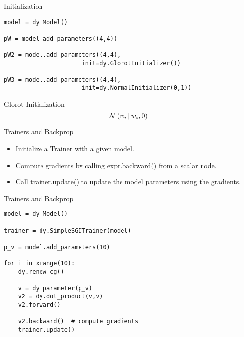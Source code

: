 \documentclass[compress]{beamer}
\begin{document}
\begin{frame}[fragile]{Initialization}

\begin{verbatim}
model = dy.Model()

pW = model.add_parameters((4,4))

pW2 = model.add_parameters((4,4),
                      init=dy.GlorotInitializer())

pW3 = model.add_parameters((4,4),
                      init=dy.NormalInitializer(0,1))
\end{verbatim}

\begin{block}{Glorot Initialization}
  \begin{equation}
    \Norm{w_i}{0}{\frac{1}{n_{\textit{in}, \textit{out}}}}
  \end{equation}
\end{block}

\end{frame}


\begin{frame}{Trainers and Backprop}

\begin{itemize}

\item Initialize a Trainer with a given model.
\item Compute gradients by calling expr.backward() from a scalar node.
\item Call trainer.update() to update the model parameters using the gradients.

\end{itemize}

\end{frame}


\begin{frame}[fragile]{Trainers and Backprop}

\begin{verbatim}
model = dy.Model()

trainer = dy.SimpleSGDTrainer(model)

p_v = model.add_parameters(10)

for i in xrange(10):
    dy.renew_cg()

    v = dy.parameter(p_v)
    v2 = dy.dot_product(v,v)
    v2.forward()

    v2.backward()  # compute gradients
    trainer.update()
\end{verbatim}

\end{frame}
\end{document}
